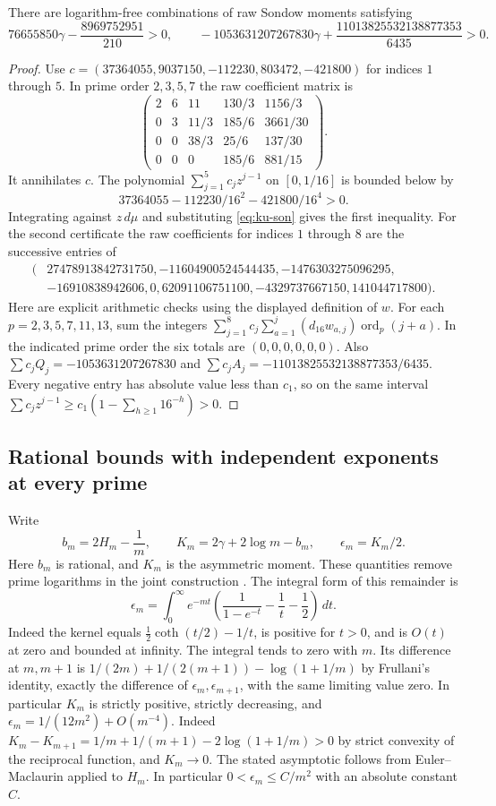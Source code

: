 \documentclass[11pt,a4paper]{article}
\theoremstyle{definition}\newtheorem{definition}[theorem]{Definition}\newtheorem{example}[theorem]{Example}
\theoremstyle{remark}\newtheorem{remark}[theorem]{Remark}
\begin{document}
\begin{proposition}\label{prop:ku-examples}
There are logarithm-free combinations of raw Sondow moments satisfying
\[
 76655850\gamma-\frac{8969752951}{210}>0,\qquad
 -1053631207267830\gamma+\frac{11013825532138877353}{6435}>0 .
\]
\end{proposition}
\begin{proof}
Use $c=(37364055,9037150,-112230,803472,-421800)$ for indices
$1$ through $5$. In prime order $2,3,5,7$ the raw coefficient matrix is
\[
 \begin{pmatrix}
 2&6&11&130/3&1156/3\\
 0&3&11/3&185/6&3661/30\\
 0&0&38/3&25/6&137/30\\
 0&0&0&185/6&881/15
 \end{pmatrix}.
\]
It annihilates $c$. The polynomial $\sum_{j=1}^5c_j z^{j-1}$ on
$[0,1/16]$ is bounded below by
\[37364055-112230/16^2-421800/16^4>0.\] Integrating against $z\,d\mu$
and substituting \eqref{eq:ku-son} gives the first inequality.
For the second certificate the raw coefficients for indices $1$ through
$8$ are the successive entries of
\[
 \begin{aligned}
 (&27478913842731750,-11604900524544435,-1476303275096295,\\
  &-16910838942606,0,62091106751100,-4329737667150,141044717800).
 \end{aligned}
\]
Here are explicit arithmetic checks using the displayed definition of $w$.
For each $p=2,3,5,7,11,13$, sum the integers
$\sum_{j=1}^8 c_j\sum_{a=1}^j (d_{16}w_{a,j})\operatorname{ord}_p(j+a)$.
In the indicated prime order the six totals are $(0,0,0,0,0,0)$.
Also $\sum c_jQ_j=-1053631207267830$ and
$\sum c_jA_j=-11013825532138877353/6435$.
Every negative entry has absolute value less than $c_1$, so on the
same interval $\sum c_jz^{j-1}\ge c_1(1-\sum_{h\ge1}16^{-h})>0$.
\end{proof}

\subsection{Rational bounds with independent exponents at every prime}
Write
\[
 b_m=2H_m-\frac1m,\qquad K_m=2\gamma+2\log m-b_m,\qquad
 \epsilon_m=K_m/2.
\]
Here $b_m$ is rational, and $K_m$ is the asymmetric moment. These quantities remove prime logarithms
in the joint construction \cite{Joint,JointRevised}. The integral form of this remainder is
\[
 \epsilon_m=\int_0^\infty e^{-mt}
   \left(\frac{1}{1-e^{-t}}-\frac1t-\frac12\right)\,dt .
\]
Indeed the kernel equals $\tfrac12\coth(t/2)-1/t$, is positive for
$t>0$, and is $O(t)$ at zero and bounded at infinity. The integral
tends to zero with $m$. Its difference at $m,m+1$ is
$1/(2m)+1/(2(m+1))-\log(1+1/m)$ by Frullani's identity, exactly the
difference of $\epsilon_m,\epsilon_{m+1}$, with the same limiting value
zero. In particular $K_m$ is
strictly positive, strictly decreasing, and
$\epsilon_m=1/(12m^2)+O(m^{-4})$. Indeed
$K_m-K_{m+1}=1/m+1/(m+1)-2\log(1+1/m)>0$ by strict convexity of the
reciprocal function, and $K_m\to0$. The stated asymptotic follows from
Euler--Maclaurin applied to $H_m$. In particular $0<\epsilon_m\le C/m^2$
with an absolute constant $C$.
\end{document}
